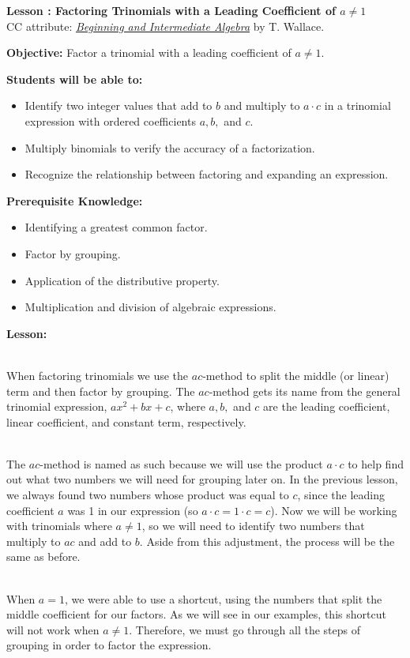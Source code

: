 \documentclass[12pt]{article}
\theoremstyle{definition}
\begin{document}
{\bf \large Lesson : Factoring Trinomials with a Leading Coefficient of $a\neq 1$}\label{les:factoring_trinomials_a_neq_1}
\\ CC attribute: \href{http://www.wallace.ccfaculty.org/book/book.html}{\it{Beginning and Intermediate Algebra}} by T. Wallace. 
\hfill \doclicenseImage[imagewidth=5em]\\
\par
{\bf Objective:} Factor a trinomial with a leading coefficient of $a\neq 1$.\\
\par
{\bf Students will be able to:}
\begin{itemize}
	\item Identify two integer values that add to $b$ and multiply to $a\cdot c$ in a trinomial expression with ordered coefficients $a,b,$ and $c$.
	\item Multiply binomials to verify the accuracy of a factorization.
	\item Recognize the relationship between factoring and expanding an expression.
\end{itemize}
{\bf Prerequisite Knowledge:}
\begin{itemize}
	\item Identifying a greatest common factor.
	\item Factor by grouping.
	\item Application of the distributive property.
	\item Multiplication and division of algebraic expressions.
\end{itemize}
\hrulefill

{\bf Lesson:}\\
\ \par
When factoring trinomials we use the $ac$-method to split the middle (or linear) term and then factor by grouping. The $ac$-method gets its name from the general trinomial expression, $a x^2 + b x + c$, where $a, b,$ and $c$ are the leading coefficient, linear coefficient, and constant term, respectively.\\
\ \par
The $ac$-method is named as such because we will use the product $a \cdot c$ to help find out what two numbers we will need for grouping later on. In the previous lesson, we always found two numbers whose product was equal to $c$, since the leading coefficient $a$ was 1 in our expression (so $a\cdot c=1\cdot c=c$).  Now we will be working with trinomials where $a\neq1$, so we will need to identify two numbers that multiply to $ac$ and add to $b$.  Aside from this adjustment, the process will be the same as before.\\
\ \par
When $a = 1$, we were able to use a shortcut, using the numbers that split the middle coefficient for our factors. As we will see in our examples, this shortcut will not work when $a \neq 1$.  Therefore, we must go through all the steps of grouping in order to factor the expression.
\newpage
\end{document}

